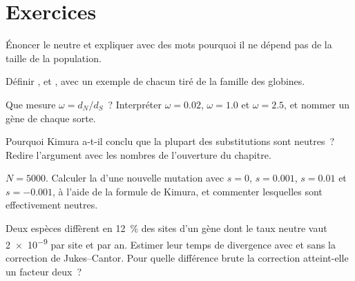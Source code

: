\section{Exercices}

\begin{exercise}[$\star$]\label{exo:b3:molecular-evolution:1}
Énoncer le  neutre et expliquer avec des mots
pourquoi il ne dépend pas de la taille de la population.
\end{exercise}

\begin{exercise}[$\star$]\label{exo:b3:molecular-evolution:2}
Définir ,  et , avec un exemple de chacun
tiré de la famille des globines.
\end{exercise}

\begin{exercise}[$\star$]\label{exo:b3:molecular-evolution:3}
Que mesure $\omega = d_{N}/d_{S}$~? Interpréter $\omega = 0.02$,
$\omega = 1.0$ et $\omega = 2.5$, et nommer un gène de chaque sorte.
\end{exercise}

\begin{exercise}[$\star$]\label{exo:b3:molecular-evolution:4}
Pourquoi Kimura a-t-il conclu que la plupart des substitutions sont
neutres~? Redire l'argument avec les nombres de l'ouverture du chapitre.
\end{exercise}

\begin{exercise}[$\star\star$]\label{exo:b3:molecular-evolution:5}
$N = 5000$. Calculer la  d'une nouvelle mutation
avec $s
= 0$, $s = 0.001$, $s = 0.01$ et $s = -0.001$, à l'aide de la formule de
Kimura, et commenter lesquelles sont effectivement neutres.
\end{exercise}

\begin{exercise}[$\star\star$]\label{exo:b3:molecular-evolution:6}
Deux espèces diffèrent en \qty{12}{\%} des sites d'un gène dont le taux
neutre vaut \qty{2e-9}{} par site et par an. Estimer leur temps de
divergence avec et sans la correction de Jukes--Cantor. Pour quelle
différence brute la correction atteint-elle un facteur deux~?
\end{exercise}


